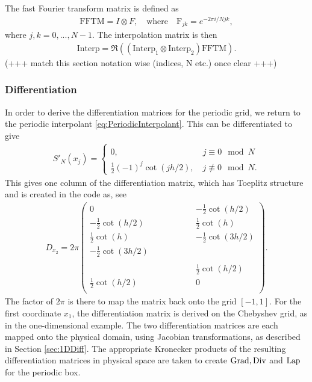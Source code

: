 The fast Fourier transform matrix is defined as
\begin{align*}
	\text{FFTM} = I \otimes F, \quad \text{where} \quad	\text{F}_{jk} =  e^{- 2 \pi i / N jk},
\end{align*}
where $j, k = 0,..., N -1$.
The interpolation matrix is then
\begin{align*}
	\text{Interp} = \Re\left(\left(\text{Interp}_{1} \otimes \text{Interp}_{2}\right) \text{FFTM}\right).
\end{align*}
(+++ match this section notation wise (indices, N etc.) once clear +++)

\subsubsection{Differentiation}
In order to derive the differentiation matrices for the periodic grid, we return to the periodic interpolant \eqref{eq:PeriodicInterpolant}. This can be differentiated to give 
\begin{align*}
	S'_N(x_j) =\left\{\begin{array}{l} 0, \phantom{(-1)^j \cot(j h /2)} \quad j \equiv 0  \mod N\\
	\frac{1}{2} (-1)^j \cot(j h /2), \quad j \not \equiv 0  \mod N.\end{array}\right.
\end{align*}
This gives one column of the differentiation matrix, which has Toeplitz structure and is created in the code as, see \cite{bibTrefethen}
\begin{align*}
	D_{x_2} = 2\pi
	\begin{pmatrix}
		0 & & &  & &  & &-\frac{1}{2} \cot(h /2) \\
		-\frac{1}{2} \cot(h /2)&  & & &  & &   &\frac{1}{2} \cot(h) \\
		\frac{1}{2} \cot(h)& &  & & &    & & -\frac{1}{2} \cot(3 h /2)\\
		-\frac{1}{2} \cot( 3 h /2) & & &   & &  & & \\
		&  & & &   & &  & \\
		& & & &  & & & \frac{1}{2} \cot(h /2)\\
		\frac{1}{2} \cot(h /2)& &  & &   &  & & 0\\
	\end{pmatrix}.
\end{align*}
The factor of $2\pi$ is there to map the matrix back onto the grid $[-1,1]$. 
For the first coordinate $x_1$, the differentiation matrix is derived on the Chebyshev grid, as in the one-dimensional example. The two differentiation matrices are each mapped onto the physical domain, using Jacobian transformations, as described in Section \ref{sec:1DDiff}. The appropriate Kronecker products of the resulting differentiation matrices in physical space are taken to create $\operatorname{Grad}, \operatorname{Div}$ and $\operatorname{Lap}$ for the periodic box. 


